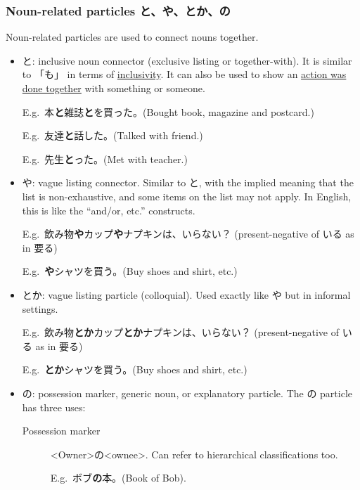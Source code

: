 \documentclass[../nihongo-gakushuu-kyouzai.tex]{subfiles}
\begin{document}
\subsubsection{Noun-related particles と、や、とか、の}\label{sec:noun-related-particles}
Noun-related particles are used to connect nouns together.
\begin{itemize}
    \item と: inclusive noun connector (exclusive listing or together-with).  It is similar to 「も」 in terms of \ul{inclusivity}. It can also be used to show an \ul{action was done together} with something or someone.

    E.g.\ 本\textbf{と}雑誌\textbf{と}を買った。(Bought book, magazine and postcard.)

    E.g.\ 友達\textbf{と}話した。(Talked with friend.)

    E.g.\ 先生\textbf{と}った。(Met with teacher.)
    \item や: vague listing connector. Similar to と,  with the implied meaning that the list is non-exhaustive, and some items on the list may not apply. In English, this is like the ``and/or, etc.'' constructs.

    E.g.\ 飲み物\textbf{や}カップ\textbf{や}ナプキンは、いらない？ (present-negative of いる as in 要る)

    E.g.\ \textbf{や}シャツを買う。(Buy shoes and shirt, etc.)
    \item とか: vague listing particle (colloquial). Used exactly like や but in informal settings. 

    E.g.\ 飲み物\textbf{とか}カップ\textbf{とか}ナプキンは、いらない？ (present-negative of いる as in 要る)

    E.g.\ \textbf{とか}シャツを買う。(Buy shoes and shirt, etc.)
    \item の: possession marker, generic noun, or explanatory particle. The の particle has three uses:
    \begin{description}
        \item[Possession marker] <Owner>の<ownee>. Can refer to hierarchical classifications too.

        E.g.\ ボブ\textbf{の}本。(Book of Bob).


\end{description}
\end{itemize}
\end{document}
